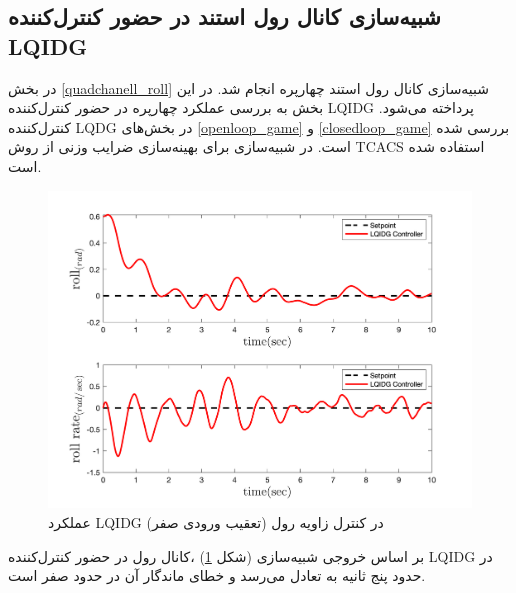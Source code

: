 \subsection{شبیه‌سازی کانال رول استند در حضور کنترل‌کننده LQIDG}\label{roll_lqidg_section}
در بخش
\ref{quadchanell_roll}
شبیه‌سازی کانال رول استند چهارپره انجام شد. در این بخش به بررسی عملکرد چهارپره در حضور کنترل‌کننده LQIDG پرداخته می‌شود. کنترل‌کننده LQDG در بخش‌های
\ref{openloop_game}
و
\ref{closedloop_game}
بررسی شده است.
 در شبیه‌سازی برای بهینه‌سازی ضرایب وزنی از روش
TCACS \cite{Karimi2010}
استفاده شده است.
\begin{figure}[H]\label{lqidg_roll_fig}
	\includegraphics[width=12cm]{../Figures/MIL/LQIDG/Roll/lqidg_roll.png}
	\centering
	\caption{عملكرد LQIDG در کنترل زاويه رول (تعقیب ورودی صفر)}
\end{figure}
بر اساس خروجی شبیه‌سازی (شکل
\ref{lqidg_roll_fig})
،کانال رول در حضور کنترل‌کننده LQIDG در حدود پنج ثانیه به تعادل می‌رسد و خطای ماندگار آن در حدود صفر است.